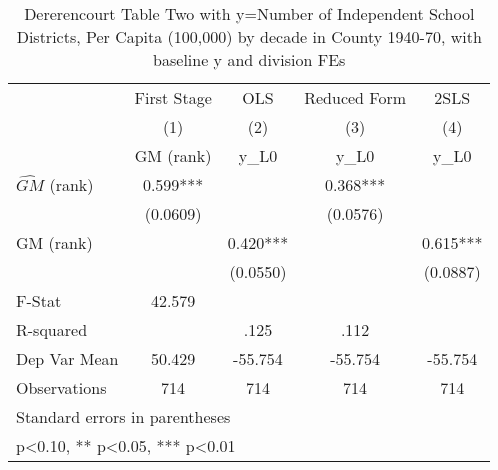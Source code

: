 \begin{table}[htbp]\centering
\def\sym#1{\ifmmode^{#1}\else\(^{#1}\)\fi}
\caption{Dererencourt Table Two with y=Number of Independent School Districts, Per Capita (100,000) by decade in County 1940-70, with baseline y and division FEs}
\begin{tabular}{l*{4}{c}}
\toprule
                    & First Stage   &         OLS   &Reduced Form   &        2SLS   \\
                    &\multicolumn{1}{c}{(1)}&\multicolumn{1}{c}{(2)}&\multicolumn{1}{c}{(3)}&\multicolumn{1}{c}{(4)}\\
                    &\multicolumn{1}{c}{GM  (rank)}&\multicolumn{1}{c}{y\_L0}&\multicolumn{1}{c}{y\_L0}&\multicolumn{1}{c}{y\_L0}\\
\midrule
$\hat{GM}$ (rank)   &       0.599***&               &       0.368***&               \\
                    &    (0.0609)   &               &    (0.0576)   &               \\
\addlinespace
GM  (rank)          &               &       0.420***&               &       0.615***\\
                    &               &    (0.0550)   &               &    (0.0887)   \\
\midrule
F-Stat              &      42.579   &               &               &               \\
R-squared           &               &        .125   &        .112   &               \\
Dep Var Mean        &      50.429   &     -55.754   &     -55.754   &     -55.754   \\
Observations        &         714   &         714   &         714   &         714   \\
\bottomrule
\multicolumn{5}{l}{\footnotesize Standard errors in parentheses}\\
\multicolumn{5}{l}{\footnotesize * p<0.10, ** p<0.05, *** p<0.01}\\
\end{tabular}
\end{table}
